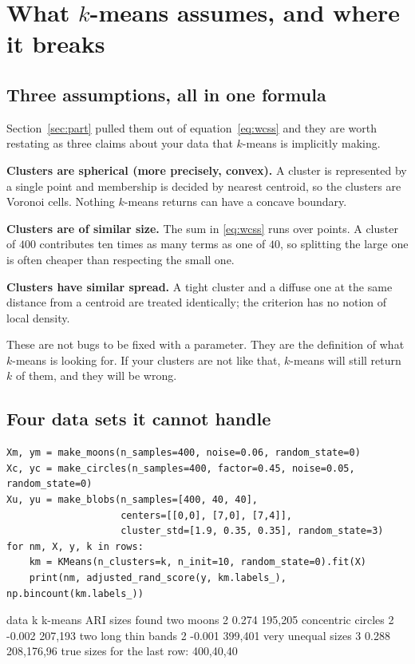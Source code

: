 \documentclass[11pt]{article}
\begin{document}
\section{What $k$-means assumes, and where it breaks}
\label{sec:assume}

\subsection{Three assumptions, all in one formula}

Section~\ref{sec:part} pulled them out of equation~\eqref{eq:wcss} and they
are worth restating as three claims about your data that $k$-means is
implicitly making.

\textbf{Clusters are spherical (more precisely, convex).} A cluster is
represented by a single point and membership is decided by nearest
centroid, so the clusters are Voronoi cells. Nothing $k$-means returns can
have a concave boundary.

\textbf{Clusters are of similar size.} The sum in \eqref{eq:wcss} runs over
points. A cluster of $400$ contributes ten times as many terms as one of
$40$, so splitting the large one is often cheaper than respecting the small
one.

\textbf{Clusters have similar spread.} A tight cluster and a diffuse one at
the same distance from a centroid are treated identically; the criterion has
no notion of local density.

\begin{keyidea}
These are not bugs to be fixed with a parameter. They are the definition of
what $k$-means is looking for. If your clusters are not like that, $k$-means
will still return $k$ of them, and they will be wrong.
\end{keyidea}

\subsection{Four data sets it cannot handle}

\begin{lstlisting}
Xm, ym = make_moons(n_samples=400, noise=0.06, random_state=0)
Xc, yc = make_circles(n_samples=400, factor=0.45, noise=0.05, random_state=0)
Xu, yu = make_blobs(n_samples=[400, 40, 40],
                    centers=[[0,0], [7,0], [7,4]],
                    cluster_std=[1.9, 0.35, 0.35], random_state=3)
for nm, X, y, k in rows:
    km = KMeans(n_clusters=k, n_init=10, random_state=0).fit(X)
    print(nm, adjusted_rand_score(y, km.labels_), np.bincount(km.labels_))
\end{lstlisting}
\begin{codeout}
  data                    k     k-means ARI    sizes found
  two moons               2        0.274       195,205
  concentric circles      2       -0.002       207,193
  two long thin bands     2       -0.001       399,401
  very unequal sizes      3        0.288       208,176,96
  true sizes for the last row: 400,40,40
\end{codeout}
\end{document}

